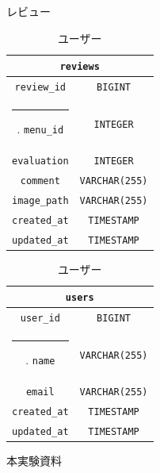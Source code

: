 \documentclass[a4paper]{ltjsarticle}
\makeatletter
\def\Hline{
    \noalign{\ifnum0=`}\fi\hrule \@height 2.\arrayrulewidth \futurelet
    \reserved@a\@xhline}
\makeatother
\begin{document}
        \begin{table}[ht]
            \begin{minipage}[t]{.49\textwidth}
                \center
                \caption{レビュー}
                \label{reviews}
                \begin{tabular}{|c|c|}
                    \hline
                    \multicolumn{2}{|c|}{\texttt{reviews}} \\ \hline \hline
                    \verb|review_id| & \verb|BIGINT| \\ \Hline
                    \verb|menu_id| & \verb|INTEGER| \\ \hline
                    \verb|evaluation| & \verb|INTEGER| \\ \hline
                    \verb|comment| & \verb|VARCHAR(255)| \\ \hline
                    \verb|image_path| & \verb|VARCHAR(255)| \\ \hline
                    \verb|created_at| & \verb|TIMESTAMP| \\ \hline
                    \verb|updated_at| & \verb|TIMESTAMP| \\ \hline
                \end{tabular}
            \end{minipage}
            \begin{minipage}[t]{.49\textwidth}
                \center
                \caption{ユーザー}
                \label{users}
                \begin{tabular}{|c|c|}
                    \hline
                    \multicolumn{2}{|c|}{\texttt{users}} \\ \hline \hline
                    \verb|user_id| & \verb|BIGINT| \\ \Hline
                    \verb|name| & \verb|VARCHAR(255)| \\ \hline
                    \verb|email| & \verb|VARCHAR(255)| \\ \hline
                    \verb|created_at| & \verb|TIMESTAMP| \\ \hline
                    \verb|updated_at| & \verb|TIMESTAMP| \\ \hline
                \end{tabular}
            \end{minipage}
        \end{table}

\begin{thebibliography}{9}
     本実験資料
\end{thebibliography}
\end{document}

